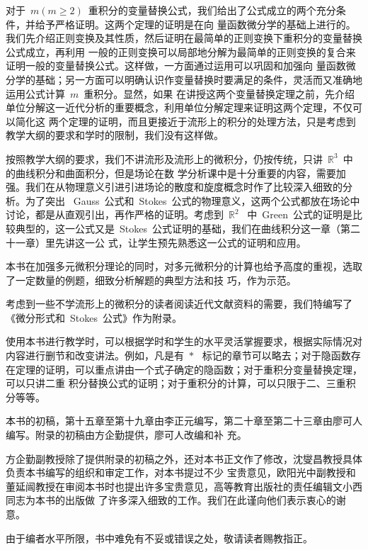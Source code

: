 \begin{preface}
对于~$m(m\geq 2)$~重积分的变量替换公式，我们给出了公式成立的两个充分条件，并给予严格证明。这两个定理的证明是在向
量函数微分学的基础上进行的。我们先介绍正则变换及其性质，然后证明在最简单的正则变换下重积分的变量替换公式成立，再利用
一般的正则变换可以局部地分解为最简单的正则变换的复合来证明一般的变量替换公式。这样做，一方面通过运用可以巩固和加强向
量函数微分学的基础；另一方面可以明确认识作变量替换时要满足的条件，灵活而又准确地运用公式计算~$m$~重积分。显然，如果
在讲授这两个变量替换定理之前，先介绍单位分解这一近代分析的重要概念，利用单位分解定理来证明这两个定理，不仅可以简化这
两个定理的证明，而且更接近于流形上的积分的处理方法，只是考虑到教学大纲的要求和学时的限制，我们没有这样做。

按照教学大纲的要求，我们不讲流形及流形上的微积分，仍按传统，只讲~$\mathbb R^3$~中的曲线积分和曲面积分，但是场论在数
学分析课中是十分重要的内容，需要加强。我们在从物理意义引进引进场论的散度和旋度概念时作了比较深入细致的分析。为了突出
~Gauss~公式和~Stokes~公式的物理意义，这两个公式都放在场论中讨论，都是从直观引出，再作严格的证明。考虑到~$\mathbb R^2$~
中~Green~公式的证明是比较典型的，这一公式又是~Stokes~公式证明的基础，我们在曲线积分这一章（第二十一章）里先讲这一公
式，让学生预先熟悉这一公式的证明和应用。

本书在加强多元微积分理论的同时，对多元微积分的计算也给予高度的重视，选取了一定数量的例题，细致分析解题的典型方法和技
巧，作为示范。

考虑到一些不学流形上的微积分的读者阅读近代文献资料的需要，我们特编写了《微分形式和~Stokes~公式》作为附录。

使用本书进行教学时，可以根据学时和学生的水平灵活掌握要求，根据实际情况对内容进行删节和改变讲法。例如，凡是有~$\ast$~
标记的章节可以略去；对于隐函数存在定理的证明，可以重点讲由一个式子确定的隐函数；对于重积分变量替换定理，可以只讲二重
积分替换公式的证明；对于重积分的计算，可以只限于二、三重积分等等。

本书的初稿，第十五章至第十九章由李正元编写，第二十章至第二十三章由廖可人编写。附录的初稿由方企勤提供，廖可人改编和补
充。

方企勤副教授除了提供附录的初稿之外，还对本书正文作了修改，沈燮昌教授具体负责本书编写的组织和审定工作，对本书提过不少
宝贵意见，欧阳光中副教授和董延闿教授在审阅本书时也提出许多宝贵意见，高等教育出版社的责任编辑文小西同志为本书的出版做
了许多深入细致的工作。我们在此谨向他们表示衷心的谢意。

由于编者水平所限，书中难免有不妥或错误之处，敬请读者赐教指正。
\end{preface}

\endinput
